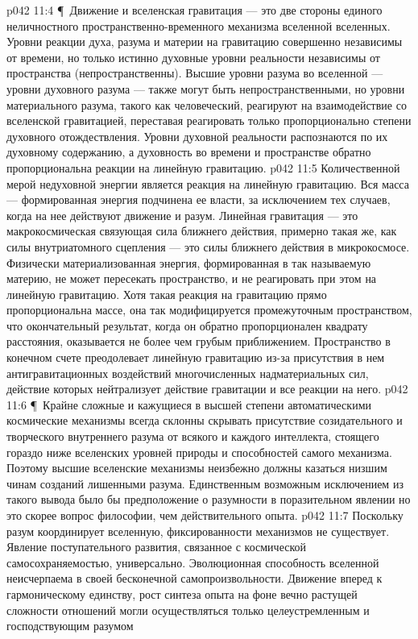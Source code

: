 \vs p042 11:4 \P\ Движение и вселенская гравитация --- это две стороны единого неличностного пространственно\hyp{}временного механизма вселенной вселенных. Уровни реакции духа, разума и материи на гравитацию совершенно независимы от времени, но только истинно духовные уровни реальности независимы от пространства (непространственны). Высшие уровни разума во вселенной --- уровни духовного разума --- также могут быть непространственными, но уровни материального разума, такого как человеческий, реагируют на взаимодействие со вселенской гравитацией, переставая реагировать только пропорционально степени духовного отождествления. Уровни духовной реальности распознаются по их духовному содержанию, а духовность во времени и пространстве обратно пропорциональна реакции на линейную гравитацию.
\vs p042 11:5 Количественной мерой недуховной энергии является реакция на линейную гравитацию. Вся масса --- формированная энергия подчинена ее власти, за исключением тех случаев, когда на нее действуют движение и разум. Линейная гравитация --- это макрокосмическая связующая сила ближнего действия, примерно такая же, как силы внутриатомного сцепления --- это силы ближнего действия в микрокосмосе. Физически материализованная энергия, формированная в так называемую материю, не может пересекать пространство, и не реагировать при этом на линейную гравитацию. Хотя такая реакция на гравитацию прямо пропорциональна массе, она так модифицируется промежуточным пространством, что окончательный результат, когда он обратно пропорционален квадрату расстояния, оказывается не более чем грубым приближением. Пространство в конечном счете преодолевает линейную гравитацию из\hyp{}за присутствия в нем антигравитационных воздействий многочисленных надматериальных сил, действие которых нейтрализует действие гравитации и все реакции на него.
\vs p042 11:6 \P\ Крайне сложные и кажущиеся в высшей степени автоматическими космические механизмы всегда склонны скрывать присутствие созидательного и творческого внутреннего разума от всякого и каждого интеллекта, стоящего гораздо ниже вселенских уровней природы и способностей самого механизма. Поэтому высшие вселенские механизмы неизбежно должны казаться низшим чинам созданий лишенными разума. Единственным возможным исключением из такого вывода было бы предположение о разумности в поразительном явлении  но это скорее вопрос философии, чем действительного опыта.
\vs p042 11:7 Поскольку разум координирует вселенную, фиксированности механизмов не существует. Явление поступательного развития, связанное с космической самосохраняемостью, универсально. Эволюционная способность вселенной неисчерпаема в своей бесконечной самопроизвольности. Движение вперед к гармоническому единству, рост синтеза опыта на фоне вечно растущей сложности отношений могли осуществляться только целеустремленным и господствующим разумом
